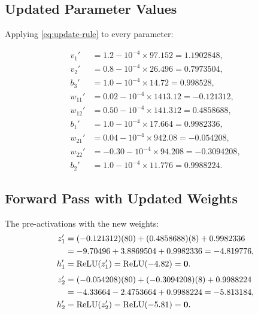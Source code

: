 \documentclass[12pt,a4paper]{article}
\newcommand{\ReLU}{\operatorname{ReLU}}
\begin{document}
\subsection{Updated Parameter Values}

Applying \cref{eq:update-rule} to every parameter:

\begin{align}
  v_1'  &= 1.2 - 10^{-4} \times 97.152  = 1.1902848, \label{eq:v1-new}\\
  v_2'  &= 0.8 - 10^{-4} \times 26.496  = 0.7973504, \label{eq:v2-new}\\
  b_3'  &= 1.0 - 10^{-4} \times 14.72   = 0.998528,  \label{eq:b3-new}\\[4pt]
  w_{11}' &= 0.02  - 10^{-4} \times 1413.12 = -0.121312,  \label{eq:w11-new}\\
  w_{12}' &= 0.50  - 10^{-4} \times 141.312 =  0.4858688, \label{eq:w12-new}\\
  b_1'    &= 1.0   - 10^{-4} \times 17.664  =  0.9982336, \label{eq:b1-new}\\[4pt]
  w_{21}' &= 0.04  - 10^{-4} \times 942.08  = -0.054208,  \label{eq:w21-new}\\
  w_{22}' &= -0.30 - 10^{-4} \times 94.208  = -0.3094208, \label{eq:w22-new}\\
  b_2'    &= 1.0   - 10^{-4} \times 11.776  =  0.9988224. \label{eq:b2-new}
\end{align}

\subsection{Forward Pass with Updated Weights}

The pre-activations with the new weights:
\begin{align}
  z_1' &= (-0.121312)(80) + (0.4858688)(8) + 0.9982336 \notag\\
       &= -9.70496 + 3.8869504 + 0.9982336 = -4.819776, \label{eq:z1-new}\\
  h_1' &= \ReLU(z_1') = \ReLU(-4.82) = \mathbf{0}. \label{eq:h1-new}
\end{align}
\begin{align}
  z_2' &= (-0.054208)(80) + (-0.3094208)(8) + 0.9988224 \notag\\
       &= -4.33664 - 2.4753664 + 0.9988224 = -5.813184, \label{eq:z2-new}\\
  h_2' &= \ReLU(z_2') = \ReLU(-5.81) = \mathbf{0}. \label{eq:h2-new}
\end{align}
\end{document}
